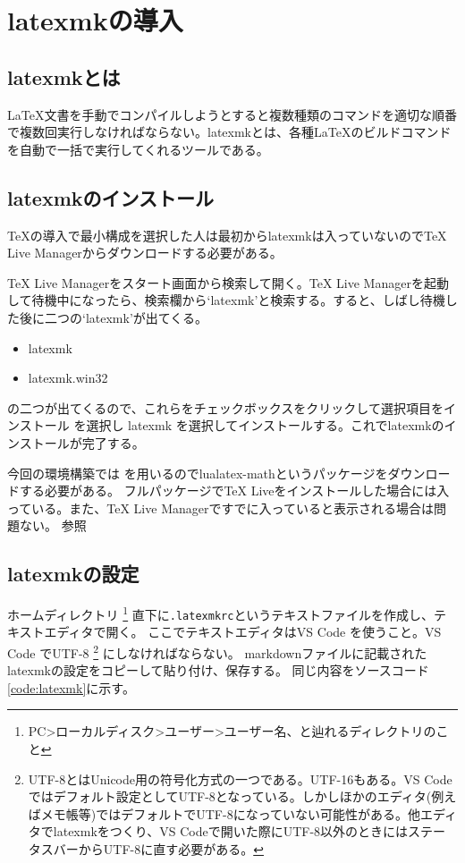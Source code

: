 \documentclass[titlepage]{ltjsarticle}
\begin{document}
\section{latexmkの導入}
\subsection{latexmkとは}
\LaTeX 文書を手動でコンパイルしようとすると複数種類のコマンドを適切な順番で複数回実行しなければならない。latexmkとは、各種\LaTeX のビルドコマンドを自動で一括で実行してくれるツールである。

\subsection{latexmkのインストール}

TeXの導入で最小構成を選択した人は最初からlatexmkは入っていないのでTeX Live Managerからダウンロードする必要がある。

TeX Live Managerをスタート画面から検索して開く。TeX Live Managerを起動して待機中になったら、検索欄から`latexmk'と検索する。すると、しばし待機した後に二つの`latexmk'が出てくる。
\begin{itemize}
  \item latexmk
  \item latexmk.win32
\end{itemize}
の二つが出てくるので、これらをチェックボックスをクリックして選択項目をインストール を選択し latexmk を選択してインストールする。これでlatexmkのインストールが完了する。

今回の環境構築では\LuaLaTeX
を用いるのでlualatex-mathというパッケージをダウンロードする必要がある。
フルパッケージでTeX Liveをインストールした場合には入っている。また、TeX Live Managerですでに入っていると表示される場合は問題ない。
  \cite{TeXLiveトラブルシューティングlualatex}参照

\subsection{latexmkの設定}
ホームディレクトリ
\footnote{
  PC>ローカルディスク>ユーザー>ユーザー名、と辿れるディレクトリのこと
}
直下に\verb|.latexmkrc|というテキストファイルを作成し、テキストエディタで開く。
ここでテキストエディタはVS Code を使うこと。VS Code でUTF-8
\footnote{UTF-8とはUnicode用の符号化方式の一つである。UTF-16もある。VS Codeではデフォルト設定としてUTF-8となっている。しかしほかのエディタ(例えばメモ帳等)ではデフォルトでUTF-8になっていない可能性がある。他エディタでlatexmkをつくり、VS Codeで開いた際にUTF-8以外のときにはステータスバーからUTF-8に直す必要がある。\cite{VSCodeの文字コード}}
にしなければならない。
markdownファイルに記載されたlatexmkの設定をコピーして貼り付け、保存する。
同じ内容をソースコード\ref{code:latexmk}に示す。
\end{document}
